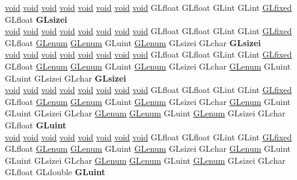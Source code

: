 \begin{DoxyCompactItemize}
\begin{tabbing}
\>\hyperlink{interfacevoid}{void} \hyperlink{interfacevoid}{void} \hyperlink{interfacevoid}{void} \hyperlink{interfacevoid}{void} \hyperlink{interfacevoid}{void} \hyperlink{interfacevoid}{void} \hyperlink{interfacevoid}{void} \hyperlink{interfacevoid}{void} GLfloat GLfloat GLint GLint \hyperlink{glheader_8h_ad6d3fa892df40dedf48ee6d84529ae5e}{GLfixed} GLfloat {\bfseries GLsizei}\\
\>\hyperlink{interfacevoid}{void} \hyperlink{interfacevoid}{void} \hyperlink{interfacevoid}{void} \hyperlink{interfacevoid}{void} \hyperlink{interfacevoid}{void} \hyperlink{interfacevoid}{void} \hyperlink{interfacevoid}{void} \hyperlink{interfacevoid}{void} GLfloat GLfloat GLint GLint \hyperlink{glheader_8h_ad6d3fa892df40dedf48ee6d84529ae5e}{GLfixed} GLfloat \hyperlink{interfacevoid}{GLenum} \hyperlink{interfacevoid}{GLenum} GLuint \hyperlink{interfacevoid}{GLenum} GLsizei GLchar {\bfseries GLsizei}\\
\>\hyperlink{interfacevoid}{void} \hyperlink{interfacevoid}{void} \hyperlink{interfacevoid}{void} \hyperlink{interfacevoid}{void} \hyperlink{interfacevoid}{void} \hyperlink{interfacevoid}{void} \hyperlink{interfacevoid}{void} \hyperlink{interfacevoid}{void} GLfloat GLfloat GLint GLint \hyperlink{glheader_8h_ad6d3fa892df40dedf48ee6d84529ae5e}{GLfixed} GLfloat \hyperlink{interfacevoid}{GLenum} \hyperlink{interfacevoid}{GLenum} GLuint \hyperlink{interfacevoid}{GLenum} GLsizei GLchar \hyperlink{interfacevoid}{GLenum} GLuint GLuint GLsizei GLchar {\bfseries GLsizei}\\
\>\hyperlink{interfacevoid}{void} \hyperlink{interfacevoid}{void} \hyperlink{interfacevoid}{void} \hyperlink{interfacevoid}{void} \hyperlink{interfacevoid}{void} \hyperlink{interfacevoid}{void} \hyperlink{interfacevoid}{void} \hyperlink{interfacevoid}{void} GLfloat GLfloat GLint GLint \hyperlink{glheader_8h_ad6d3fa892df40dedf48ee6d84529ae5e}{GLfixed} GLfloat \hyperlink{interfacevoid}{GLenum} \hyperlink{interfacevoid}{GLenum} GLuint \hyperlink{interfacevoid}{GLenum} GLsizei GLchar \hyperlink{interfacevoid}{GLenum} GLuint GLuint GLsizei GLchar \hyperlink{interfacevoid}{GLenum} \hyperlink{interfacevoid}{GLenum} GLuint \hyperlink{interfacevoid}{GLenum} GLsizei GLchar GLfloat {\bfseries GLuint}\\
\>\hyperlink{interfacevoid}{void} \hyperlink{interfacevoid}{void} \hyperlink{interfacevoid}{void} \hyperlink{interfacevoid}{void} \hyperlink{interfacevoid}{void} \hyperlink{interfacevoid}{void} \hyperlink{interfacevoid}{void} \hyperlink{interfacevoid}{void} GLfloat GLfloat GLint GLint \hyperlink{glheader_8h_ad6d3fa892df40dedf48ee6d84529ae5e}{GLfixed} GLfloat \hyperlink{interfacevoid}{GLenum} \hyperlink{interfacevoid}{GLenum} GLuint \hyperlink{interfacevoid}{GLenum} GLsizei GLchar \hyperlink{interfacevoid}{GLenum} GLuint GLuint GLsizei GLchar \hyperlink{interfacevoid}{GLenum} \hyperlink{interfacevoid}{GLenum} GLuint \hyperlink{interfacevoid}{GLenum} GLsizei GLchar GLfloat GLdouble {\bfseries GLuint}\\

\end{tabbing}
\end{DoxyCompactItemize}
